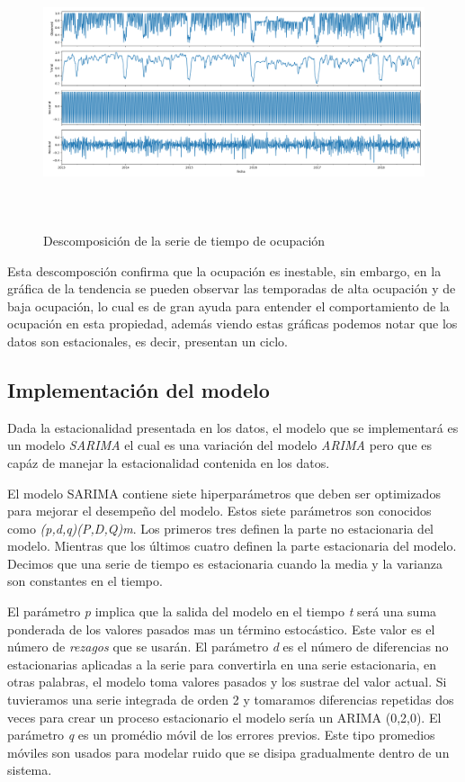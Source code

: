 \begin{figure}[H]
  \centering
      \includegraphics[width=\maxwidth,height=8cm]{figures/Decomp.png}    
  \caption{Descomposición de la serie de tiempo de ocupación}
\end{figure}

Esta descomposción confirma que la ocupación es inestable, sin embargo, en la gráfica de la tendencia se pueden observar las temporadas de alta ocupación y de baja ocupación, lo cual es de gran ayuda para entender el comportamiento de la ocupación en esta propiedad, además viendo estas gráficas podemos notar que los datos son estacionales, es decir, presentan un ciclo.

\subsection*{Implementación del modelo}
Dada la estacionalidad presentada en los datos, el modelo que se implementará es un modelo \emph{SARIMA} el cual es una variación del modelo \emph{ARIMA} pero que es capáz de manejar la estacionalidad contenida en los datos.

El modelo SARIMA contiene siete hiperparámetros que deben ser optimizados para mejorar el desempeño del modelo. Estos siete parámetros son conocidos como \emph{(p,d,q)(P,D,Q)m}. Los primeros tres definen la parte no estacionaria del modelo. Mientras que los últimos cuatro definen la parte estacionaria del modelo.  Decimos que una serie de tiempo es estacionaria cuando la media y la varianza son constantes en el tiempo.

El parámetro \emph{p} implica que la salida del modelo en el tiempo \emph{t} será una suma ponderada de los valores pasados mas un término estocástico. Este valor es el número de \emph{rezagos} que se usarán. El parámetro \emph{d} es el número de diferencias no estacionarias aplicadas a la serie para convertirla en una serie estacionaria, en otras palabras, el modelo toma valores pasados y los sustrae del valor actual. Si tuvieramos una serie integrada de orden 2 y tomaramos diferencias repetidas dos veces para crear un proceso estacionario el modelo sería un ARIMA (0,2,0). El parámetro \emph{q} es un promédio móvil de los errores previos. Este tipo promedios móviles son usados para modelar ruido que se disipa gradualmente dentro de un sistema.

